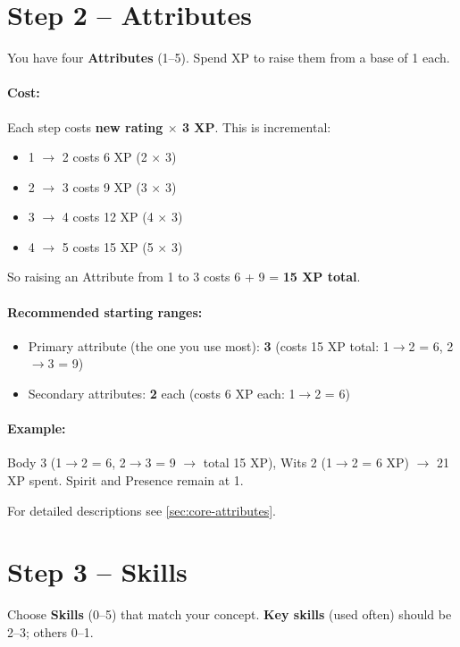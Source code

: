 \section{Step 2 -- Attributes}
You have four \textbf{Attributes} (1--5). Spend XP to raise them from a base of 1 each.

\paragraph{Cost:} Each step costs \textbf{new rating \(\times\) 3 XP}. This is incremental:
\begin{itemize}
  \item 1 $\to$ 2 costs 6 XP (2 $\times$ 3)
  \item 2 $\to$ 3 costs 9 XP (3 $\times$ 3)
  \item 3 $\to$ 4 costs 12 XP (4 $\times$ 3)
  \item 4 $\to$ 5 costs 15 XP (5 $\times$ 3)
\end{itemize}
So raising an Attribute from 1 to 3 costs 6 + 9 = \textbf{15 XP total}.

\paragraph{Recommended starting ranges:}
\begin{itemize}
  \item Primary attribute (the one you use most): \textbf{3} (costs 15 XP total: 1$\to$2 = 6, 2$\to$3 = 9)
  \item Secondary attributes: \textbf{2} each (costs 6 XP each: 1$\to$2 = 6)
\end{itemize}

\paragraph{Example:} Body 3 (1$\to$2 = 6, 2$\to$3 = 9 $\rightarrow$ total 15 XP), Wits 2 (1$\to$2 = 6 XP) $\rightarrow$ 21 XP spent. Spirit and Presence remain at 1.

For detailed descriptions see \ref{sec:core-attributes}.

\section{Step 3 -- Skills}
Choose \textbf{Skills} (0--5) that match your concept. \textbf{Key skills} (used often) should be 2--3; others 0--1.

